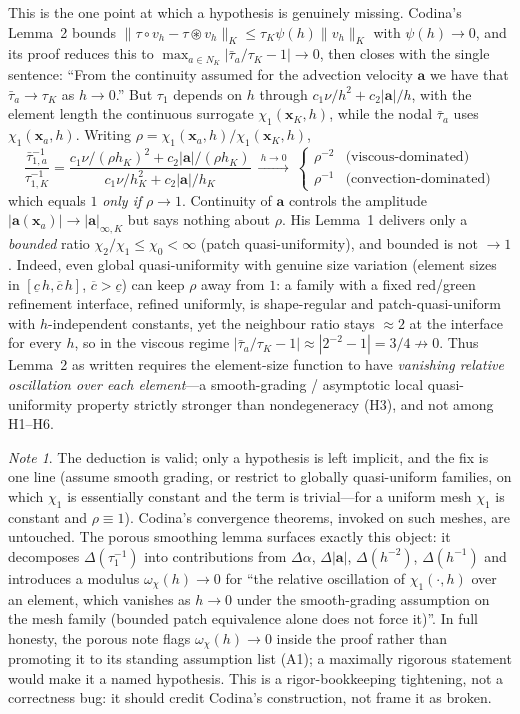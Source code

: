 \documentclass[11pt]{article}
\theoremstyle{remark}
\newtheorem*{note}{Note}
\newcommand{\ba}{\boldsymbol{a}}
\newcommand{\norm}[1]{\lVert #1 \rVert}
\newcommand{\smul}{\circledast}
\newcommand{\pmul}{\circ}
\begin{document}
This is the one point at which a hypothesis is genuinely missing. Codina's Lemma~2 bounds
$\norm{\tau\pmul v_h-\tau\smul v_h}_K\le\tau_K\psi(h)\norm{v_h}_K$ with $\psi(h)\to0$, and
its proof reduces this to $\max_{a\in N_K}|\bar\tau_a/\tau_K-1|\to0$, then closes with the
single sentence: ``From the continuity assumed for the advection velocity $\ba$ we have that
$\bar\tau_a\to\tau_K$ as $h\to0$.'' But $\tau_1$ depends on $h$ through $c_1\nu/h^2+c_2|\ba|/h$,
with the element length the continuous surrogate $\chi_1(\boldsymbol x_K,h)$, while the nodal
$\bar\tau_a$ uses $\chi_1(\boldsymbol x_a,h)$. Writing $\rho=\chi_1(\boldsymbol x_a,h)/\chi_1(\boldsymbol x_K,h)$,
\[
  \frac{\bar\tau_{1,a}^{-1}}{\tau_{1,K}^{-1}}
  =\frac{c_1\nu/(\rho h_K)^2+c_2|\ba|/(\rho h_K)}{c_1\nu/h_K^2+c_2|\ba|/h_K}
  \ \xrightarrow{\ h\to0\ }\ \begin{cases}\rho^{-2}&\text{(viscous-dominated)}\\[0.3ex]\rho^{-1}&\text{(convection-dominated)}\end{cases}
\]
which equals $1$ \emph{only if} $\rho\to1$. Continuity of $\ba$ controls the amplitude
$|\ba(\boldsymbol x_a)|\to|\ba|_{\infty,K}$ but says nothing about $\rho$. His Lemma~1 delivers
only a \emph{bounded} ratio $\chi_2/\chi_1\le\chi_0<\infty$ (patch quasi-uniformity), and
bounded is not $\to1$. Indeed, even global quasi-uniformity with genuine size variation
(element sizes in $[\underline c\,h,\overline c\,h]$, $\overline c>\underline c$) can keep
$\rho$ away from $1$: a family with a fixed red/green refinement interface, refined uniformly,
is shape-regular and patch-quasi-uniform with $h$-independent constants, yet the neighbour
ratio stays $\approx2$ at the interface for every $h$, so in the viscous regime
$|\bar\tau_a/\tau_K-1|\approx|2^{-2}-1|=3/4\not\to0$. Thus Lemma~2 as written requires the
element-size function to have \emph{vanishing relative oscillation over each element}---a
smooth-grading / asymptotic local quasi-uniformity property strictly stronger than
nondegeneracy (H3), and not among H1--H6.

\begin{note}
The deduction is valid; only a hypothesis is left implicit, and the fix is one line (assume
smooth grading, or restrict to globally quasi-uniform families, on which $\chi_1$ is
essentially constant and the term is trivial---for a uniform mesh $\chi_1$ is constant and
$\rho\equiv1$). Codina's convergence theorems, invoked on such meshes, are untouched. The
porous smoothing lemma surfaces exactly this object: it decomposes $\Delta(\tau_1^{-1})$ into
contributions from $\Delta\alpha$, $\Delta|\ba|$, $\Delta(h^{-2})$, $\Delta(h^{-1})$ and
introduces a modulus $\omega_\chi(h)\to0$ for ``the relative oscillation of $\chi_1(\cdot,h)$
over an element, which vanishes as $h\to0$ under the smooth-grading assumption on the mesh
family (bounded patch equivalence alone does not force it)''. In full honesty, the porous note
flags $\omega_\chi(h)\to0$ inside the proof rather than promoting it to its standing
assumption list (A1); a maximally rigorous statement would make it a named hypothesis. This is
a rigor-bookkeeping tightening, not a correctness bug: it should credit Codina's construction,
not frame it as broken.
\end{note}
\end{document}
